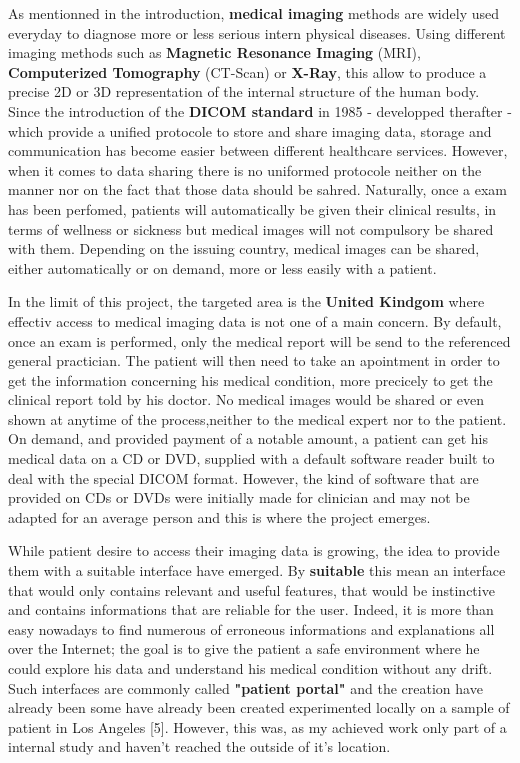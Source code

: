 As mentionned in the introduction, \textbf{medical imaging} methods are widely used everyday to diagnose more or less serious intern physical diseases. Using different imaging methods such as \textbf{Magnetic Resonance Imaging} (MRI), \textbf{Computerized Tomography} (CT-Scan) or \textbf{X-Ray}, this allow to produce a precise 2D or 3D representation of the internal structure of the human body. Since the introduction of the \textbf{DICOM standard} in 1985 - developped therafter - which provide a unified protocole to store and share imaging data, storage and communication has become easier between different healthcare services. However, when it comes to data sharing there is no uniformed protocole neither on the manner nor on the fact that those data should be sahred. Naturally, once a exam has been perfomed, patients will automatically be given their clinical results, in terms of wellness or sickness but medical images will not compulsory be shared with them. Depending on the issuing country, medical images can be shared, either automatically or on demand, more or less easily with a patient.

\newline \vspace{5mm}

In the limit of this project, the targeted area is the \textbf{United Kindgom} where effectiv access to medical imaging data is not one of a main concern. By default, once an exam is performed, only the medical report will be send to the referenced general practician. The patient will then need to take an apointment in order to get the information concerning his medical condition, more precicely to get the clinical report told by his doctor. No medical images would be shared or even shown at anytime of the process,neither to the medical expert nor to the patient. On demand, and provided payment of a notable amount, a patient can get his medical data on a CD or DVD, supplied with a default software reader built to deal with the special DICOM format. However, the kind of software that are provided on CDs or DVDs were initially made for clinician and may not be adapted for an average person and this is where the project emerges. 


\newline \vspace{5mm}
While patient desire to access their imaging data is growing, the idea to provide them with a suitable interface have emerged. By \textbf{suitable} this mean an interface that would only contains relevant and useful features, that would be instinctive and contains informations  that are reliable for the user. Indeed, it is more than easy nowadays to find numerous of erroneous informations and explanations all over the Internet; the goal is to give the patient a safe environment where he could explore his data and understand his medical condition without any drift. Such interfaces are commonly called \textbf{"patient portal"} and the creation have already been some have already been created experimented locally on a sample of patient in Los Angeles [5]. However, this was, as my achieved work only part of a internal study and haven't reached the outside of it's location.


